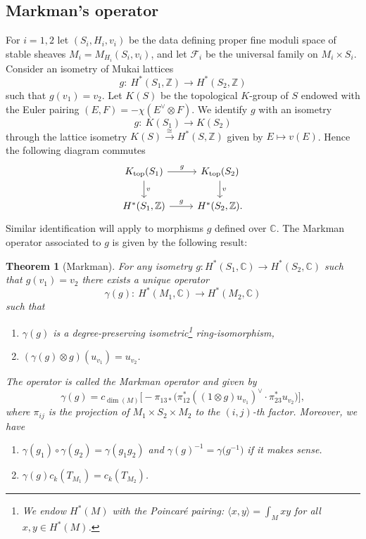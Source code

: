 \documentclass[11pt]{article}
\numberwithin{equation}{section}
\numberwithin{equation}{section}
\newtheorem{thm}[Theorem]{Theorem}
\newcommand{\BC}{{\mathbb{C}}}
\newcommand{\BZ}{{\mathbb{Z}}}
\newcommand{\CF}{{\mathcal F}}
\newcommand{\1}{\mathsf{1}}
\begin{document}
\subsection{Markman's operator} %
For $i=1,2$ let $(S_i, H_i, v_i)$ be the data defining
proper fine moduli space of stable sheaves $M_i = M_{H_i}(S_i,v_i)$,
and let $\CF_i$ be the universal family on $M_i \times S_i$.
%
Consider an isometry of Mukai lattices
\[
g\colon\ H^{\ast}(S_1, \BZ) \to H^{\ast}(S_2, \BZ)
\]
such that $g(v_1) = v_2$.
Let $K(S)$ be the topological $K$-group of $S$ endowed with the Euler pairing $(E , F) = -\chi(E^{\vee} \otimes F)$. We identify $g$ with an isometry
\[
g\colon\ K(S_1) \to K(S_2)
\]
through the lattice isometry
$K(S) \xrightarrow{\cong} H^{\ast}(S,\BZ)$ given by $E \mapsto v(E)$.
Hence the following diagram commutes
\[
\begin{tikzcd}
K_{\mathrm{top}}(S_1) \ar{r}{g} \ar{d}{v} & K_{\mathrm{top}}(S_2) \ar{d}{v} \\
H^{\ast}(S_1, \BZ) \ar{r}{g} & H^{\ast}(S_2, \BZ).
\end{tikzcd}
\]
Similar identification will apply to morphisms $g$ defined over $\BC$.
The Markman operator associated to $g$ is given by the following result:

{\samepage\begin{thm}[Markman] \label{thm:Markman_operator} For any isometry $g\colon H^{\ast}(S_1, \BC) \to H^{\ast}(S_2, \BC)$ such that $g(v_1) = v_2$
there exists a unique operator
\[
\gamma(g)\colon \ H^{\ast}(M_1, \BC) \to H^{\ast}(M_2, \BC)
\]
such that
\begin{enumerate}
\item[$(a)$] $\gamma(g)$ is a degree-preserving isometric\footnote{We endow $H^{\ast}(M)$ with the Poincar\'e pairing: $\langle x,y \rangle = \int_{M} x y$ for all $x,y \in H^{\ast}(M)$.} ring-isomorphism,
\item[$(b)$] $(\gamma(g) \otimes g)(u_{v_1}) = u_{v_2}$.
\end{enumerate}
The operator is called the \emph{Markman operator} and given by
\begin{equation}
\gamma(g) = c_{\dim(M)}\bigl[ - \pi_{13 \ast}\big( \pi_{12}^{\ast} ((1 \otimes g) u_{v_1})^{\vee} \cdot \pi_{23}^{\ast} u_{v_2} \big) \bigr],
\label{Mopnew}
\end{equation}
where $\pi_{ij}$ is the projection of $M_1 \times S_2 \times M_2$ to the $(i,j)$-th factor.
Moreover, we have
\begin{enumerate}
\item[$(c)$] $\gamma(g_1) \circ \gamma(g_2) = \gamma(g_1g_2)$ and $\gamma(g)^{-1} = \gamma\big(g^{-1}\big)$ if it makes sense.
\item[$(d)$] $\gamma(g) c_k(T_{M_1}) = c_k(T_{M_2})$.
\end{enumerate}
\end{thm}}
\end{document}
